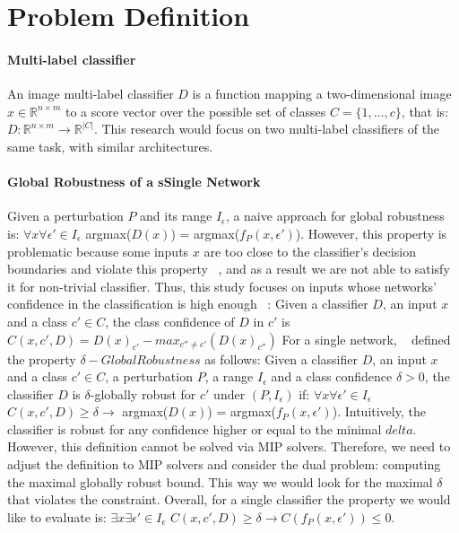
\section{Problem Definition}

\sloppy
\paragraph{Multi-label classifier}
An image multi-label classifier $D$ is a function mapping a two-dimensional image $x\in \mathbb{R}^{n \times m}$ to a score vector over the possible set of classes $C=\{1,\ldots,c\}$, that is:
$D: \mathbb{R}^{n \times m} \rightarrow {\mathbb{R}}^{|C|}$.
This research would focus on two multi-label classifiers of the same task, with similar architectures.


\paragraph{Global Robustness of a sSingle Network}
Given a perturbation $P$ and its range $I_\epsilon$, a naive approach for global robustness is:
$\forall{x}\forall{\epsilon'}\in{I_\epsilon}$  argmax($D(x)$) = argmax($f_P(x,\epsilon')$).
However, this property is problematic because some inputs $x$ are too close to the classifier's decision boundaries and violate this property ~\cite{DECISIONBOUND}, and as a result we are not able to satisfy it for non-trivial classifier. Thus, this study focuses on inputs whose networks' confidence in the classification is high enough ~\cite{VHAGAR}:
Given a classifier $D$, an input $x$ and a class $c'\in{C}$, the class confidence of $D$ in $c'$ is $C(x,c',D)=D(x)_{c'}-max_{c''\ne c'}(D(x)_{c''})$
For a single network, ~\cite{VHAGAR} defined the property $\delta-Global Robustness$ as follows:
Given a classifier $D$, an input $x$ and a class $c'\in{C}$, a perturbation $P$, a range $I_\epsilon$ and a class confidence $\delta>0$, the classifier $D$ is $\delta$-globally robust for $c'$ under $(P,I_\epsilon)$ if:
$\forall{x}\forall{\epsilon'}\in{I_\epsilon}$ $C(x,c',D) \geq \delta \rightarrow$ argmax($D(x)$) = argmax($f_P(x,\epsilon')$).
Intuitively, the classifier is robust for any confidence higher or equal to the minimal $delta$. However, this definition cannot be solved via MIP solvers. Therefore, we need to adjust the definition to MIP solvers and consider the dual problem: computing the maximal globally robust bound. This way we would look for the maximal $\delta$ that violates the constraint. Overall, for a single classifier the property we would like to evaluate is:
$\exists{x}\exists{\epsilon'}\in{I_\epsilon}$ $C(x,c',D) \geq \delta \rightarrow C(f_P(x,\epsilon'))\leq 0$.


